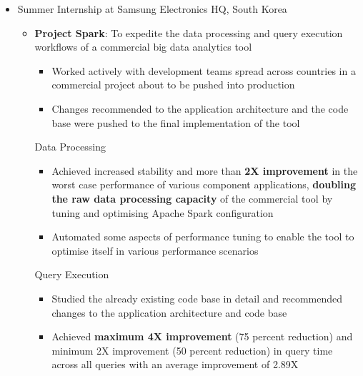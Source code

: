 \documentclass{article}
\begin{document}
\begin{itemize}[leftmargin=0.07cm]
\item {\large Summer Internship at Samsung Electronics HQ, South Korea}\hspace*{\fill}
\vspace{-0cm}

\begin{itemize}[leftmargin=0.07cm]
	\item \textbf{Project Spark}: To expedite the data processing and query execution workflows	of a commercial big data analytics tool
	\begin{itemize}
	\item Worked actively with development teams spread across countries in a commercial project about to be pushed into production
	\item Changes recommended to the application architecture and the code base were pushed to the final implementation of the tool
	\end{itemize}
	Data Processing\\ \vspace{-0.2cm}
	\begin{itemize}
	\item Achieved increased stability and more than \textbf{2X improvement} in the worst case performance of various component applications, \textbf{doubling the raw data processing capacity} of the commercial tool by tuning and optimising Apache Spark configuration
    \item Automated some aspects of performance tuning to enable the tool to optimise itself in various performance scenarios
    \end{itemize}
    \hspace{0.1cm}Query Execution\\   \vspace{-0.2cm}
	\begin{itemize}
	\item Studied the already existing code base in detail and recommended changes to the application architecture and code base
    \item Achieved \textbf{maximum 4X improvement} (75 percent reduction) and minimum 2X improvement (50 percent reduction) in query time across all queries with an average improvement of 2.89X
    \end{itemize}
\end{itemize}
\end{itemize}
\end{document}
